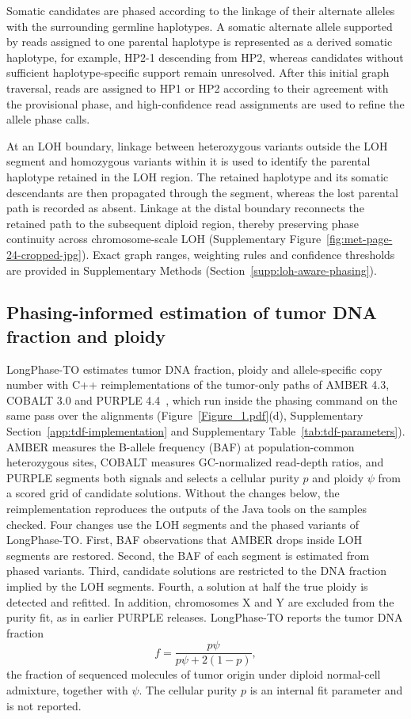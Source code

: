 \documentclass[unnumsec,webpdf,contemporary,large]{oup-authoring-template}
\begin{document}
Somatic candidates are phased according to the linkage of their alternate alleles with the surrounding germline haplotypes. A somatic alternate allele supported by reads assigned to one parental haplotype is represented as a derived somatic haplotype, for example, HP2-1 descending from HP2, whereas candidates without sufficient haplotype-specific support remain unresolved. After this initial graph traversal, reads are assigned to HP1 or HP2 according to their agreement with the provisional phase, and high-confidence read assignments are used to refine the allele phase calls.

At an LOH boundary, linkage between heterozygous variants outside the LOH segment and homozygous variants within it is used to identify the parental haplotype retained in the LOH region. The retained haplotype and its somatic descendants are then propagated through the segment, whereas the lost parental path is recorded as absent. Linkage at the distal boundary reconnects the retained path to the subsequent diploid region, thereby preserving phase continuity across chromosome-scale LOH (Supplementary Figure~\ref{fig:met-page-24-cropped-jpg}). Exact graph ranges, weighting rules and confidence thresholds are provided in Supplementary Methods (Section~\ref{supp:loh-aware-phasing}).

\subsection{Phasing-informed estimation of tumor DNA fraction and ploidy}\label{methods-tdf}

LongPhase-TO estimates tumor DNA fraction, ploidy and allele-specific copy number with C++ reimplementations of the tumor-only paths of AMBER 4.3, COBALT 3.0 and PURPLE 4.4~\cite{priestley2019}, which run inside the phasing command on the same pass over the alignments (Figure~\ref{Figure_1.pdf}(d), Supplementary Section~\ref{app:tdf-implementation} and Supplementary Table~\ref{tab:tdf-parameters}). AMBER measures the B-allele frequency (BAF) at population-common heterozygous sites, COBALT measures GC-normalized read-depth ratios, and PURPLE segments both signals and selects a cellular purity $p$ and ploidy $\psi$ from a scored grid of candidate solutions. Without the changes below, the reimplementation reproduces the outputs of the Java tools on the samples checked. Four changes use the LOH segments and the phased variants of LongPhase-TO. First, BAF observations that AMBER drops inside LOH segments are restored. Second, the BAF of each segment is estimated from phased variants. Third, candidate solutions are restricted to the DNA fraction implied by the LOH segments. Fourth, a solution at half the true ploidy is detected and refitted. In addition, chromosomes X and Y are excluded from the purity fit, as in earlier PURPLE releases. LongPhase-TO reports the tumor DNA fraction
\[
f = \frac{p\psi}{p\psi + 2(1-p)},
\]
the fraction of sequenced molecules of tumor origin under diploid normal-cell admixture, together with $\psi$. The cellular purity $p$ is an internal fit parameter and is not reported.
\end{document}
